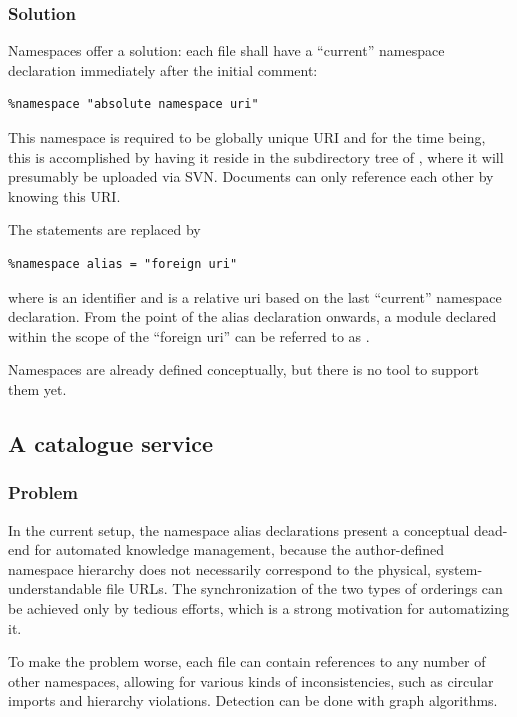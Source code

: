 \subsubsection{Solution}

Namespaces offer a solution: each file shall have a ``current'' namespace declaration immediately after the initial comment:
\begin{verbatim}
%namespace "absolute namespace uri"
\end{verbatim}
This namespace is required to be globally unique URI and for the time being, this is accomplished by having it reside in the subdirectory tree of , where it will presumably be uploaded via SVN. Documents can only reference each other by knowing this URI.

The  statements are replaced by 
\begin{verbatim}
%namespace alias = "foreign uri"
\end{verbatim}
where  is an identifier and  is a relative uri based on the last ``current'' namespace declaration. From the point of the alias declaration onwards, a module  declared within the scope of the ``foreign uri''  can be referred to as .

Namespaces are already defined conceptually, but there is no tool to support them yet.


\subsection{A catalogue service}

\subsubsection{Problem}

In the current setup, the namespace alias declarations present a conceptual dead-end for automated knowledge
  management, because the author-defined namespace hierarchy does not necessarily correspond to the physical, system-understandable file URLs. The  synchronization of the two types of orderings can be achieved only  by tedious efforts, which is a strong motivation for automatizing it.

To make the problem worse, each file can contain references to any number of other namespaces, allowing for
various kinds of inconsistencies, such as circular imports and hierarchy violations. Detection can be done with graph algorithms.

